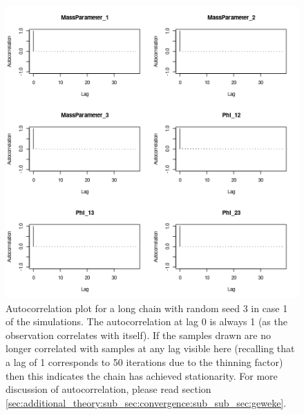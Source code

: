 \documentclass[12pt]{article} %
\begin{document}
	\begin{figure}[!htb]
		\centering
		\includegraphics[scale=0.65]{Images/Gen_data/Case_1/Auto_correlation_plot_3.png}
		\caption{Autocorrelation plot for a long chain with random seed 3 in case 1 of the simulations. The autocorrelation at lag 0 is always 1 (as the observation correlates with itself). If the samples drawn are no longer correlated with samples at any lag visible here (recalling that a lag of 1 corresponds to 50 iterations due to the thinning factor) then this indicates the chain has achieved stationarity. For more discussion of autocorrelation, please read section \ref{sec:additional_theory:sub_sec:convergence:sub_sub_sec:geweke}.}
		\label{fig:gen_data_case_1_autocorrelation_plot_3}
	\end{figure}
\end{document}
